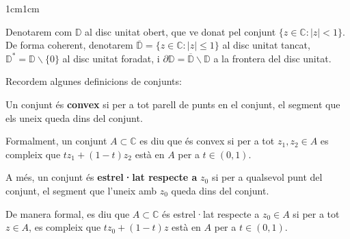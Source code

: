 \begin{adjustwidth}{1cm}{1cm}
\begin{definicio}
    Denotarem com $\mathbb{D}$ al disc unitat obert, que ve donat pel conjunt $\{z\in \mathbb{C}: |z|<1\}$. De forma coherent, denotarem $\overline{\mathbb{D}}=\{z\in \mathbb{C}: |z|\leq 1\}$ al disc unitat tancat, $\mathbb{D}^*=\mathbb{D}\backslash \{0\}$ al disc unitat foradat, i $\partial\mathbb{D}=\overline{\mathbb{D}}\backslash\mathbb{D}$  a la frontera del disc unitat.
\end{definicio}


    

Recordem algunes definicions de conjunts:

\begin{definicio}
    Un conjunt és \textbf{convex} si per a tot parell de punts en el conjunt, el segment que els uneix queda dins del conjunt.

    Formalment, un conjunt $A\subset \mathbb{C}$ es diu que és convex si per a tot $z_1,z_2\in A$ es compleix que $tz_1+(1-t)z_2$ està en $A$ per a $t\in (0,1)$.

    A més, un conjunt és \textbf{estrel·lat respecte a} $z_0$ si per a qualsevol punt del conjunt, el segment que l'uneix amb $z_0$ queda dins del conjunt.

    De manera formal, es diu que $A\subset \mathbb{C}$ és estrel·lat respecte a $z_0\in A$ si per a tot $z\in A$, es compleix que $tz_0+(1-t)z$ està en $A$ per a $t\in (0,1)$.
\end{definicio}


\end{adjustwidth}

